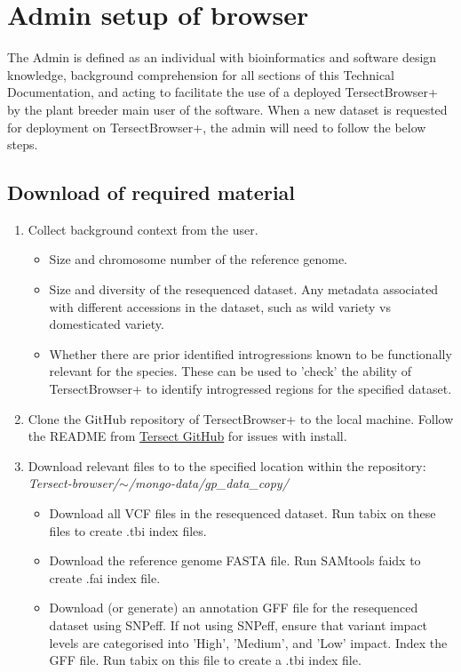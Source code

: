 \documentclass[12pt]{article}
\begin{document}
\section{Admin setup of browser}
The Admin is defined as an individual with bioinformatics and software design knowledge, background comprehension for all sections of this Technical Documentation, and acting to facilitate the use of a deployed TersectBrowser+ by the plant breeder main user of the software. When a new dataset is requested for deployment on TersectBrowser+, the admin will need to follow the below steps.

\subsection{Download of required material}
\begin{enumerate}
    \item Collect background context from the user.
\begin{itemize}
    \item Size and chromosome number of the reference genome.
    \item Size and diversity of the resequenced dataset. Any metadata associated with different accessions in the dataset, such as wild variety vs domesticated variety.
    \item Whether there are prior identified introgressions known to be functionally relevant for the species. These can be used to 'check' the ability of TersectBrowser+ to identify introgressed regions for the specified dataset.
\end{itemize}
    \item Clone the GitHub repository of TersectBrowser+ to the local machine. Follow the README from \hyperlink {https://github.com/Tersect-Browser/Tersect-browser.git}{Tersect GitHub} for issues with install.
    \item Download relevant files to to the specified location within the repository: \textit{Tersect-browser/\(\sim \)/mongo-data/gp\_data\_copy/}
    \begin{itemize}
        \item Download all VCF files in the resequenced dataset. Run tabix on these files to create .tbi index files.
        \item Download the reference genome FASTA file. Run SAMtools faidx to create .fai index file.
        \item Download (or generate) an annotation GFF file for the resequenced dataset using SNPeff. If not using SNPeff, ensure that variant impact levels are categorised into 'High', 'Medium', and 'Low' impact. Index the GFF file. Run tabix on this file to create a .tbi index file.

\end{itemize}
\end{enumerate}
\end{document}
